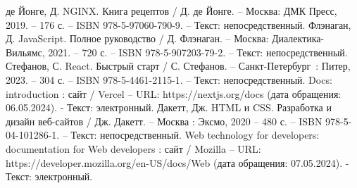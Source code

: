 \begin{thebibliography}{20}
	 де Йонге, Д. NGINX. Книга рецептов / Д. де Йонге. – Москва: ДМК Пресс, 2019. – 176 с. – ISBN 978-5-97060-790-9. – Текст: непосредственный.
	 Флэнаган, Д. JavaScript. Полное руководство / Д. Флэнаган. – Москва: Диалектика-Вильямс, 2021. – 720 с. – ISBN 978-5-907203-79-2. – Текст: непосредственный.
	 Стефанов, С. React. Быстрый старт / С. Стефанов. – Санкт-Петербург~: Питер, 2023. – 304 с. – ISBN 978-5-4461-2115-1. – Текст: непосредственный.
	 Docs: introduction : сайт / Vercel – URL: https://nextjs.org/docs (дата обращения: 06.05.2024). - Текст: электронный.
	 Дакетт, Дж. HTML и CSS. Разработка и дизайн веб-сайтов / Дж. Дакетт. – Москва : Эксмо, 2020 – 480 с. – ISBN 978-5-04-101286-1. – Текст: непосредственный.
	 Web technology for developers: documentation for Web developers : сайт / Mozilla – URL: https://developer.mozilla.org/en-US/docs/Web (дата обращения: 07.05.2024). - Текст: электронный.
\end{thebibliography}